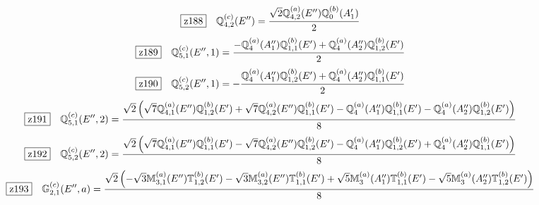 \documentclass[fleqn,10pt,landscape]{jsarticle}
\begin{document}
\begin{dmath*}
\hspace*{3mm}\fbox{z188}\quad \mathbb{Q}_{4,2}^{(c)}(E^{\prime\prime})=\frac{\sqrt{2} \mathbb{Q}_{4,2}^{(a)}(E^{\prime\prime}) \mathbb{Q}_{0}^{(b)}(A_{1}^{\prime})}{2}
\end{dmath*}
\begin{dmath*}
\hspace*{3mm}\fbox{z189}\quad \mathbb{Q}_{5,1}^{(c)}(E^{\prime\prime},1)=\frac{- \mathbb{Q}_{4}^{(a)}(A_{1}^{\prime\prime}) \mathbb{Q}_{1,1}^{(b)}(E^{\prime}) + \mathbb{Q}_{4}^{(a)}(A_{2}^{\prime\prime}) \mathbb{Q}_{1,2}^{(b)}(E^{\prime})}{2}
\end{dmath*}
\begin{dmath*}
\hspace*{3mm}\fbox{z190}\quad \mathbb{Q}_{5,2}^{(c)}(E^{\prime\prime},1)=- \frac{\mathbb{Q}_{4}^{(a)}(A_{1}^{\prime\prime}) \mathbb{Q}_{1,2}^{(b)}(E^{\prime}) + \mathbb{Q}_{4}^{(a)}(A_{2}^{\prime\prime}) \mathbb{Q}_{1,1}^{(b)}(E^{\prime})}{2}
\end{dmath*}
\begin{dmath*}
\hspace*{3mm}\fbox{z191}\quad \mathbb{Q}_{5,1}^{(c)}(E^{\prime\prime},2)=\frac{\sqrt{2} \left(\sqrt{7} \mathbb{Q}_{4,1}^{(a)}(E^{\prime\prime}) \mathbb{Q}_{1,2}^{(b)}(E^{\prime}) + \sqrt{7} \mathbb{Q}_{4,2}^{(a)}(E^{\prime\prime}) \mathbb{Q}_{1,1}^{(b)}(E^{\prime}) - \mathbb{Q}_{4}^{(a)}(A_{1}^{\prime\prime}) \mathbb{Q}_{1,1}^{(b)}(E^{\prime}) - \mathbb{Q}_{4}^{(a)}(A_{2}^{\prime\prime}) \mathbb{Q}_{1,2}^{(b)}(E^{\prime})\right)}{8}
\end{dmath*}
\begin{dmath*}
\hspace*{3mm}\fbox{z192}\quad \mathbb{Q}_{5,2}^{(c)}(E^{\prime\prime},2)=\frac{\sqrt{2} \left(\sqrt{7} \mathbb{Q}_{4,1}^{(a)}(E^{\prime\prime}) \mathbb{Q}_{1,1}^{(b)}(E^{\prime}) - \sqrt{7} \mathbb{Q}_{4,2}^{(a)}(E^{\prime\prime}) \mathbb{Q}_{1,2}^{(b)}(E^{\prime}) - \mathbb{Q}_{4}^{(a)}(A_{1}^{\prime\prime}) \mathbb{Q}_{1,2}^{(b)}(E^{\prime}) + \mathbb{Q}_{4}^{(a)}(A_{2}^{\prime\prime}) \mathbb{Q}_{1,1}^{(b)}(E^{\prime})\right)}{8}
\end{dmath*}
\begin{dmath*}
\hspace*{3mm}\fbox{z193}\quad \mathbb{G}_{2,1}^{(c)}(E^{\prime\prime},a)=\frac{\sqrt{2} \left(- \sqrt{3} \mathbb{M}_{3,1}^{(a)}(E^{\prime\prime}) \mathbb{T}_{1,2}^{(b)}(E^{\prime}) - \sqrt{3} \mathbb{M}_{3,2}^{(a)}(E^{\prime\prime}) \mathbb{T}_{1,1}^{(b)}(E^{\prime}) + \sqrt{5} \mathbb{M}_{3}^{(a)}(A_{1}^{\prime\prime}) \mathbb{T}_{1,1}^{(b)}(E^{\prime}) - \sqrt{5} \mathbb{M}_{3}^{(a)}(A_{2}^{\prime\prime}) \mathbb{T}_{1,2}^{(b)}(E^{\prime})\right)}{8}
\end{dmath*}
\end{document}
